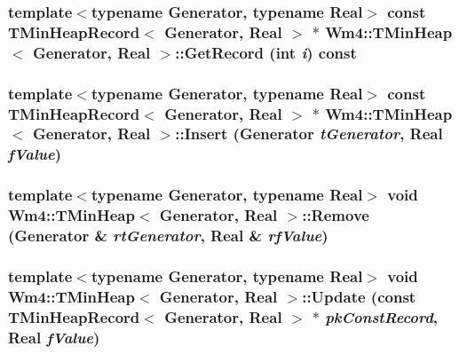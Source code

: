 \subsubsection{\setlength{\rightskip}{0pt plus 5cm}template$<$typename Generator, typename Real$>$ const {\bf TMin\-Heap\-Record}$<$ Generator, Real $>$ $\ast$ {\bf Wm4::TMin\-Heap}$<$ Generator, Real $>$::Get\-Record (int {\em i}) const}\label{classWm4_1_1TMinHeap_09afb4e4ac1571adfeec18ee53276f2a}


\subsubsection{\setlength{\rightskip}{0pt plus 5cm}template$<$typename Generator, typename Real$>$ const {\bf TMin\-Heap\-Record}$<$ Generator, Real $>$ $\ast$ {\bf Wm4::TMin\-Heap}$<$ Generator, Real $>$::Insert (Generator {\em t\-Generator}, Real {\em f\-Value})}\label{classWm4_1_1TMinHeap_000f545d53c1757b7ffe674a09c64461}


\subsubsection{\setlength{\rightskip}{0pt plus 5cm}template$<$typename Generator, typename Real$>$ void {\bf Wm4::TMin\-Heap}$<$ Generator, Real $>$::Remove (Generator \& {\em rt\-Generator}, Real \& {\em rf\-Value})}\label{classWm4_1_1TMinHeap_299ce5189f2e027f6c79f8d194f2a823}


\subsubsection{\setlength{\rightskip}{0pt plus 5cm}template$<$typename Generator, typename Real$>$ void {\bf Wm4::TMin\-Heap}$<$ Generator, Real $>$::Update (const {\bf TMin\-Heap\-Record}$<$ Generator, Real $>$ $\ast$ {\em pk\-Const\-Record}, Real {\em f\-Value})}\label{classWm4_1_1TMinHeap_c57153678d32e250b36f9d87da7e771f}


